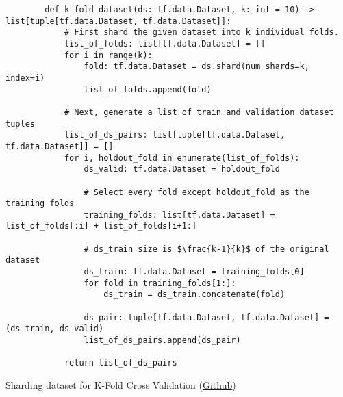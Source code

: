 \begin{listing}[H]
        \begin{verbatim}
        def k_fold_dataset(ds: tf.data.Dataset, k: int = 10) -> list[tuple[tf.data.Dataset, tf.data.Dataset]]:
            # First shard the given dataset into k individual folds.
            list_of_folds: list[tf.data.Dataset] = []
            for i in range(k):
                fold: tf.data.Dataset = ds.shard(num_shards=k, index=i)
                list_of_folds.append(fold)
        
            # Next, generate a list of train and validation dataset tuples
            list_of_ds_pairs: list[tuple[tf.data.Dataset, tf.data.Dataset]] = []
            for i, holdout_fold in enumerate(list_of_folds):
                ds_valid: tf.data.Dataset = holdout_fold
        
                # Select every fold except holdout_fold as the training folds
                training_folds: list[tf.data.Dataset] = list_of_folds[:i] + list_of_folds[i+1:]

                # ds_train size is $\frac{k-1}{k}$ of the original dataset
                ds_train: tf.data.Dataset = training_folds[0]
                for fold in training_folds[1:]:
                    ds_train = ds_train.concatenate(fold)
        
                ds_pair: tuple[tf.data.Dataset, tf.data.Dataset] = (ds_train, ds_valid)
                list_of_ds_pairs.append(ds_pair)
            
            return list_of_ds_pairs
        \end{verbatim}
    \caption{Sharding dataset for K-Fold Cross Validation (\href{https://github.com/ShenZhouHong/radiography-ai-project/blob/cf8c9e9a1f07849787a98b2fc51df690354bf194/python/common/kfold.py}{Github})}\label{listing:sharding}
\end{listing}